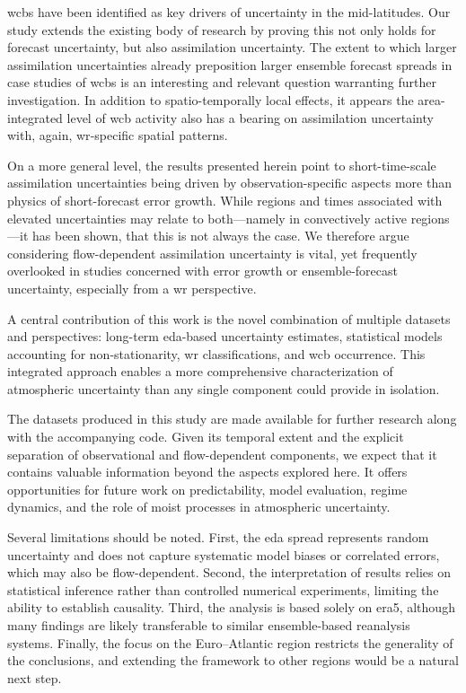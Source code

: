 \glspl{wcb} have been identified as key drivers of uncertainty in the mid-latitudes. Our study extends the existing body of research by proving this not only holds for forecast uncertainty, but also assimilation uncertainty. The extent to which larger assimilation uncertainties already preposition larger ensemble forecast spreads in case studies of \glspl{wcb} is an interesting and relevant question warranting further investigation. In addition to spatio-temporally local effects, it appears the area-integrated level of \gls{wcb} activity also has a bearing on assimilation uncertainty with, again, \gls{wr}-specific spatial patterns.

On a more general level, the results presented herein point to short-time-scale assimilation uncertainties being driven by observation-specific aspects more than physics of short-forecast error growth. While regions and times associated with elevated uncertainties may relate to both---namely in convectively active regions---it has been shown, that this is not always the case. We therefore argue considering flow-dependent assimilation uncertainty is vital, yet frequently overlooked in studies concerned with error growth or ensemble-forecast uncertainty, especially from a \gls{wr} perspective.

A central contribution of this work is the novel combination of multiple datasets and perspectives: long-term \gls{eda}-based uncertainty estimates, statistical models accounting for non-stationarity, \gls{wr} classifications, and \gls{wcb} occurrence. This integrated approach enables a more comprehensive characterization of atmospheric uncertainty than any single component could provide in isolation.

The datasets produced in this study are made available for further research along with the accompanying code. Given its temporal extent and the explicit separation of observational and flow-dependent components, we expect that it contains valuable information beyond the aspects explored here. It offers opportunities for future work on predictability, model evaluation, regime dynamics, and the role of moist processes in atmospheric uncertainty.

Several limitations should be noted. First, the \gls{eda} spread represents random uncertainty and does not capture systematic model biases or correlated errors, which may also be flow-dependent. Second, the interpretation of results relies on statistical inference rather than controlled numerical experiments, limiting the ability to establish causality. Third, the analysis is based solely on \gls{era5}, although many findings are likely transferable to similar ensemble-based reanalysis systems. Finally, the focus on the Euro--Atlantic region restricts the generality of the conclusions, and extending the framework to other regions would be a natural next step.

